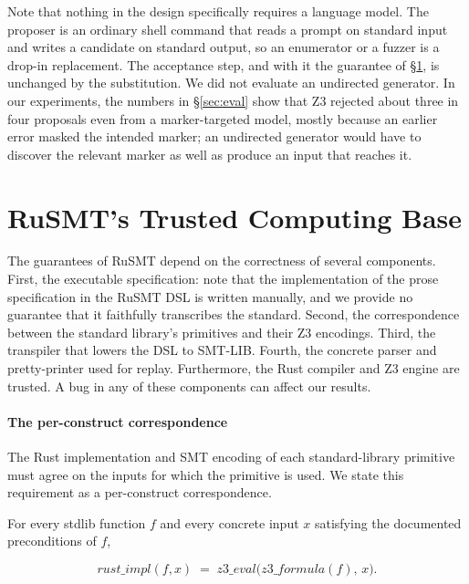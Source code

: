 \documentclass[sigconf,screen]{acmart}
\theoremstyle{definition}
\theoremstyle{remark}
\newcommand{\rusmt}{RuSMT}
\begin{document}
Note that nothing in the design specifically requires a language model. The
proposer is an ordinary shell command that reads a prompt on standard input and
writes a candidate on standard output, so an enumerator or a fuzzer is a drop-in
replacement. The acceptance step, and with it the guarantee of \S\ref{sec:trust}, is unchanged by the substitution. We did not evaluate an undirected generator. In our experiments, the numbers in \S\ref{sec:eval} show that Z3 rejected about three in four proposals even from a marker-targeted model, mostly because an earlier error masked the intended marker; an undirected generator would have to discover the relevant marker as well as produce an input that reaches it.

\section{\rusmt{}'s Trusted Computing Base}
\label{sec:trust}

The guarantees of \rusmt{} depend on the correctness of several components. First, the executable specification: note that the implementation of the prose specification in the \rusmt{} DSL is written manually, and we provide no guarantee that it faithfully transcribes the standard. Second, the correspondence between the standard library's primitives and their Z3 encodings. Third, the transpiler that lowers the DSL to SMT-LIB. Fourth, the concrete parser and pretty-printer used for replay. Furthermore, the Rust compiler and Z3 engine are trusted. A bug in any of these components can affect our results.

\paragraph{The per-construct correspondence}

The Rust implementation and SMT encoding of each standard-library primitive must agree on the inputs for which the primitive is used. We state this requirement as a per-construct correspondence.

\begin{definition}\label{def:contract}
For every stdlib function $f$ and every concrete input $x$ satisfying the documented preconditions of $f$,

\[
  \mathit{rust\_impl}(f, x) \;=\; \mathit{z3\_eval}\bigl(\mathit{z3\_formula}(f),\, x\bigr).
\]

\end{definition}
\end{document}
